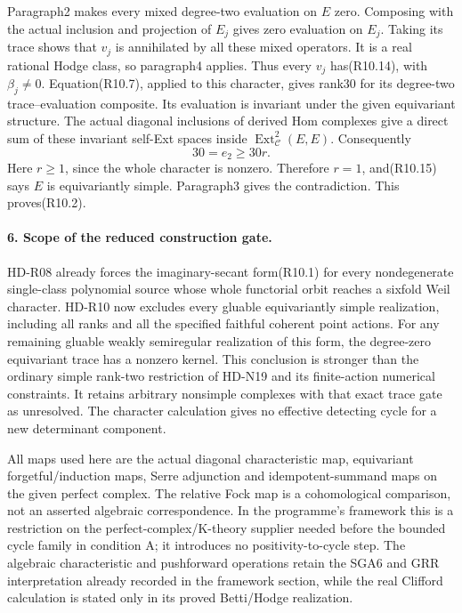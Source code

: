 Paragraph2 makes every mixed degree-two evaluation on $E$
zero. Composing with the actual inclusion and projection of
$E_j$ gives zero evaluation on $E_j$. Taking its trace shows
that $v_j$ is annihilated by all these mixed operators.
It is a real rational Hodge class, so paragraph4 applies.
Thus every $v_j$ has(R10.14), with $\beta_j\ne0$.
Equation(R10.7), applied to this character, gives rank30
for its degree-two trace--evaluation composite. Its
evaluation is invariant under the given equivariant
structure. The actual diagonal inclusions of derived Hom
complexes give a direct sum of these invariant self-Ext
spaces inside $\operatorname{Ext}^2_{\mathcal C}(E,E)$.
Consequently
\[
                         30=e_2\ge30r.                      \tag{R10.16}
\]
Here $r\ge1$, since the whole character is nonzero. Therefore
$r=1$, and(R10.15) says $E$ is equivariantly simple.
Paragraph3 gives the contradiction. This proves(R10.2).

\paragraph{6. Scope of the reduced construction gate.}
HD-R08 already forces the imaginary-secant form(R10.1) for
every nondegenerate single-class polynomial source whose whole
functorial orbit reaches a sixfold Weil character. HD-R10 now
excludes every gluable equivariantly simple realization, including
all ranks and all the specified faithful coherent point actions.
For any remaining gluable weakly semiregular realization of this
form, the degree-zero equivariant trace has a nonzero kernel.
This conclusion is stronger than the ordinary simple rank-two
restriction of HD-N19 and its finite-action numerical constraints.
It retains arbitrary nonsimple complexes with that exact trace
gate as unresolved. The character calculation gives no effective
detecting cycle for a new determinant component.

All maps used here are the actual diagonal characteristic map,
equivariant forgetful/induction maps, Serre adjunction and
idempotent-summand maps on the given perfect complex. The relative
Fock map is a cohomological comparison, not an asserted algebraic
correspondence. In the programme's framework this is a restriction
on the perfect-complex/K-theory supplier needed before the bounded
cycle family in condition A; it introduces no positivity-to-cycle
step. The algebraic characteristic and pushforward operations retain
the SGA6 and GRR interpretation already recorded in the framework
section, while the real Clifford calculation is stated only in its
proved Betti/Hodge realization.

